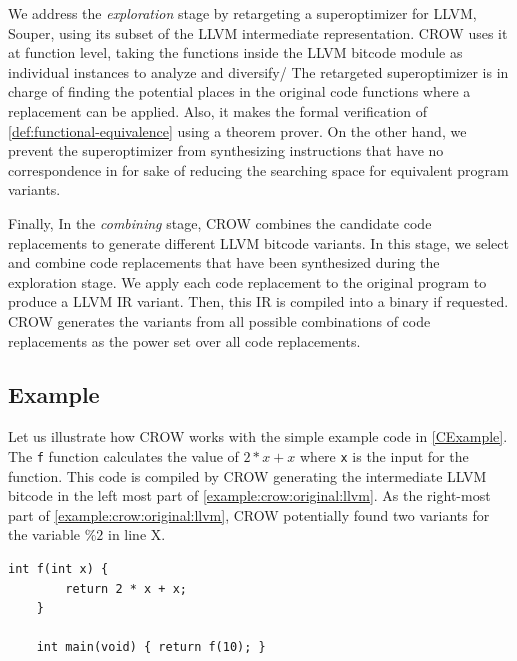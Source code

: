 We address the \emph{exploration} stage  by retargeting a  superoptimizer for  LLVM, Souper, using its subset of the LLVM intermediate representation. CROW uses it at function level, taking the functions inside the LLVM bitcode module as individual instances to analyze and diversify/ The retargeted superoptimizer is in charge of finding the potential places in the original code functions where a replacement can be applied. Also, it makes the formal verification of \autoref{def:functional-equivalence} using a theorem prover. 
On the other hand, we prevent the superoptimizer from synthesizing instructions that have no correspondence in \wasm for sake of reducing the searching space for equivalent program variants.


Finally, In the \emph{combining} stage, CROW combines the candidate code replacements to generate different LLVM bitcode variants. In this stage, we select and combine code replacements that have been synthesized during the exploration stage. We apply each code replacement to the original program to produce a LLVM IR variant.
Then, this IR is compiled into a \wasm binary if requested. CROW generates the variants from all possible combinations of code replacements as the power set over all code replacements.  

\subsection{Example}
\label{section:crow:example}
 Let us illustrate how CROW works with the simple example code in \autoref{CExample}. The \texttt{f} function calculates the value of $2 * x + x$ where \texttt{x} is the input for the function.  This code is compiled by CROW generating the intermediate LLVM bitcode in the left most part of \autoref{example:crow:original:llvm}. As the right-most part of \autoref{example:crow:original:llvm}, CROW potentially found two variants for the variable $\%2$ in line X.  

 \begin{code}
    \begin{lstlisting}[style=CStyle]
    int f(int x) { 
        return 2 * x + x; 
    }
    
    int main(void) { return f(10); }
    \end{lstlisting}
    
    \end{code}

